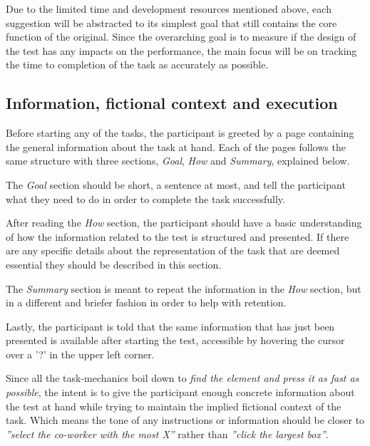 \documentclass[nofilelist,dvipsnames]{cslthse-msc}
\begin{document}
{        Due to the limited time and development resources mentioned above, each
        suggestion will be abstracted to its simplest goal that still contains
        the core function of the original. Since the overarching goal is to
        measure if the design of the test has any impacts on the performance,
        the main focus will be on tracking the time to completion of the task
        as accurately as possible.

      \subsection{Information, fictional context and execution}

        Before starting any of the tasks, the participant is greeted by a page
        containing the general information about the task at hand. Each of the
        pages follows the same structure with three sections, \textit{Goal},
        \textit{How} and \textit{Summary}, explained below.

        The \textit{Goal} section should be short{\findref}, a sentence at
        most{\findref}, and tell the participant what they need to do in order
        to complete the task successfully.

        After reading the \textit{How} section, the participant should have a
        basic understanding of how the information related to the test is
        structured and presented. If there are any specific details about the
        representation of the task that are deemed essential they should be
        described in this section.

        The \textit{Summary} section is meant to repeat the information in the
        \textit{How} section, but in a different and briefer fashion in order
        to help with retention\findref.

        Lastly, the participant is told that the same information that has just
        been presented is available after starting the test, accessible by
        hovering the cursor over a '?' in the upper left corner.

        Since all the task-mechanics boil down to
        \textit{find the element and press it as fast as possible},
        the intent is to give the participant enough concrete
        information about the test at hand while trying to maintain the
        implied fictional context of the task. Which means the tone of any
        instructions or information should be closer to
        \textit{''select the co-worker with the most X''} rather than
        \textit{''click the largest box''}.

}
\end{document}
